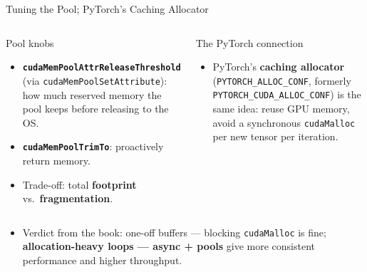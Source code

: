 \documentclass[aspectratio=169]{beamer}
\newcommand{\kw}[1]{\textbf{\textcolor{kwblue}{#1}}}
\begin{document}
\begin{frame}{Tuning the Pool; PyTorch's Caching Allocator}
  \begin{columns}[t]
    \begin{block}{Pool knobs}
      \begin{itemize}\small
        \item \kw{\texttt{cudaMemPoolAttrReleaseThreshold}} (via
              \texttt{cudaMemPoolSetAttribute}): how much reserved memory the pool keeps
              before releasing to the OS.
        \item \kw{\texttt{cudaMemPoolTrimTo}}: proactively return memory.
        \item Trade-off: total \kw{footprint} vs.\ \kw{fragmentation}.
      \end{itemize}
    \end{block}
    \begin{block}{The PyTorch connection}
      \begin{itemize}\small
        \item PyTorch's \kw{caching allocator} (\texttt{PYTORCH\_ALLOC\_CONF}, formerly
              \texttt{PYTORCH\_CUDA\_ALLOC\_CONF}) is the same idea: reuse GPU memory,
              avoid a synchronous \texttt{cudaMalloc} per new tensor per iteration.
      \end{itemize}
    \end{block}
  \end{columns}
  \medskip
  \begin{itemize}
    \item Verdict from the book: one-off buffers --- blocking \texttt{cudaMalloc} is fine;
          \kw{allocation-heavy loops --- async + pools} give more consistent performance
          and higher throughput.
  \end{itemize}
\end{frame}
\end{document}
